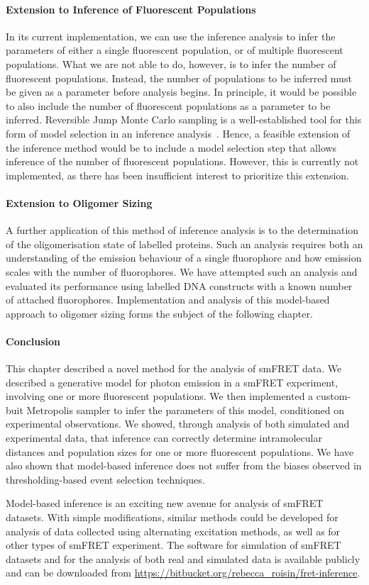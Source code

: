 \paragraph{Extension to Inference of Fluorescent Populations}
In its current implementation, we can use the inference analysis to infer the parameters of either a single fluorescent population, or of multiple fluorescent populations. What we are not able to do, however, is to infer the number of fluorescent populations. Instead, the number of populations to be inferred must be given as a parameter before analysis begins. In principle, it would be possible to also include the number of fluorescent populations as a parameter to be inferred. Reversible Jump Monte Carlo sampling is a well-established tool for this form of model selection in an inference analysis~\cite{green1995}. Hence, a feasible extension of the inference method would be to include a model selection step that allows inference of the number of fluorescent populations. However, this is currently not implemented, as there has been insufficient interest to prioritize this extension. 

\paragraph{Extension to Oligomer Sizing}
A further application of this method of inference analysis is to the determination of the oligomerisation state of labelled proteins. Such an analysis requires both an understanding of the emission behaviour of a single fluorophore and how emission scales with the number of fluorophores. We have attempted such an analysis and evaluated its performance using labelled DNA constructs with a known number of attached fluorophores. Implementation and analysis of this model-based approach to oligomer sizing forms the subject of the following chapter.

\paragraph{Conclusion}
This chapter described a novel method for the analysis of smFRET data. We described a generative model for photon emission in a smFRET experiment, involving one or more fluorescent populations. We then implemented a custom-buit Metropolis sampler to infer the parameters of this model, conditioned on experimental observations. We showed, through analysis of both simulated and experimental data, that inference can correctly determine intramolecular distances and population sizes for one or more fluorescent populations. We have also shown that model-based inference does not suffer from the biases observed in thresholding-based event selection techniques.  

Model-based inference is an exciting new avenue for analysis of smFRET datasets. With simple modifications, similar methods could be developed for analysis of data collected using alternating excitation methods, as well as for other types of smFRET experiment. The software for simulation of smFRET datasets and for the analysis of both real and simulated data is available publicly and can be downloaded from \url{https://bitbucket.org/rebecca_roisin/fret-inference}. 
